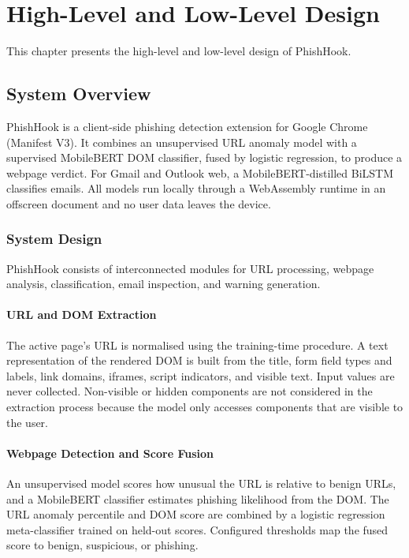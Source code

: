 \documentclass{FastFyp}
\begin{document}
\chapter{High-Level and Low-Level Design}
\label{ch:design}
This chapter presents the high-level and low-level design of PhishHook. 

\section{System Overview}

PhishHook is a client-side phishing detection extension for Google Chrome (Manifest V3). It combines an unsupervised URL anomaly model with a supervised MobileBERT DOM classifier, fused by logistic regression, to produce a webpage verdict. For Gmail and Outlook web, a MobileBERT-distilled BiLSTM classifies emails. All models run locally through a WebAssembly runtime in an offscreen document and no user data leaves the device.

\subsection{System Design}

PhishHook consists of interconnected modules for URL processing, webpage analysis, classification, email inspection, and warning generation.

\subsubsection{URL and DOM Extraction}

The active page's URL is normalised using the training-time procedure. A text representation of the rendered DOM is built from the title, form field types and labels, link domains, iframes, script indicators, and visible text. Input values are never collected. Non-visible or hidden components are not considered in the extraction process because the model only accesses components that are visible to the user.

\subsubsection{Webpage Detection and Score Fusion}

An unsupervised model scores how unusual the URL is relative to benign URLs, and a MobileBERT classifier estimates phishing likelihood from the DOM. The URL anomaly percentile and DOM score are combined by a logistic regression meta-classifier trained on held-out scores. Configured thresholds map the fused score to benign, suspicious, or phishing.
\end{document}
